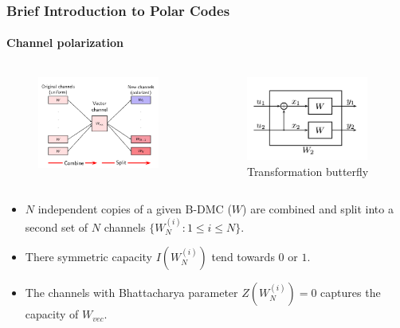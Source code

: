 \documentclass[xcolor=dvipsnames]{beamer}
\begin{document}
\begin{frame}[label = polarcodes]
\frametitle{Brief Introduction to Polar Codes}
\framesubtitle{Channel polarization}
\begin{minipage}[0.9\textheight]{\textwidth}
\begin{columns}
\begin{column}{0.6\textwidth}
\begin{figure}
\centering
\includegraphics[width=4cm]{./channelcomb.png}
\end{figure}
\end{column}
\begin{column}{0.4\textwidth}
\begin{figure}
\centering
\includegraphics[width=4cm]{./arikanfly.png}
\caption{Transformation butterfly}
\end{figure}
\end{column}
\end{columns}
\end{minipage}
\begin{itemize}
\item $N$ independent copies of a given B-DMC ($W$) are combined and split into a second set of $N$ channels $\{W^{(i)}_N : 1 \leq i \leq N \}$.
\item There symmetric capacity $I(W^{(i)}_N )$ tend towards $0$ or $1$.
\item The channels with Bhattacharya parameter $Z(W^{(i)}_N)=0$ captures the capacity of $W_{vec}$.
\end{itemize}
\end{frame}
\end{document}
